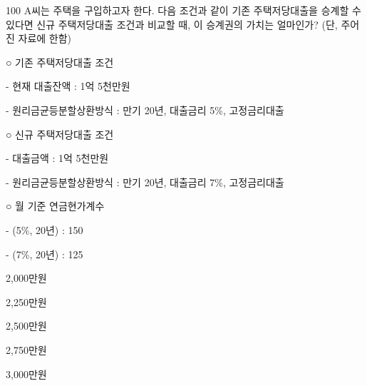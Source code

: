 \begin{question}{100}
A씨는 주택을 구입하고자 한다. 다음 조건과 같이 기존 주택저당대출을 승계할 수 있다면 신규 주택저당대출 조건과 비교할 때, 이 승계권의 가치는 얼마인가? (단, 주어진 자료에 한함)
\begin{framedtext}
○ 기존 주택저당대출 조건 \par
\hspace*{0.5em}- 현재 대출잔액 : 1억 5천만원 \par
\hspace*{0.5em}- 원리금균등분할상환방식 : 만기 20년, 대출금리 5\%, 고정금리대출 \par
○ 신규 주택저당대출 조건 \par
\hspace*{0.5em}- 대출금액 : 1억 5천만원 \par
\hspace*{0.5em}- 원리금균등분할상환방식 : 만기 20년, 대출금리 7\%, 고정금리대출 \par
○ 월 기준 연금현가계수 \par
\hspace*{0.5em}- (5\%, 20년) : 150 \par
\hspace*{0.5em}- (7\%, 20년) : 125 \par
\end{framedtext}
\begin{choices}
  \item 2,000만원
  \item 2,250만원
  \item 2,500만원
  \item 2,750만원
  \item 3,000만원
\end{choices}
\end{question}
